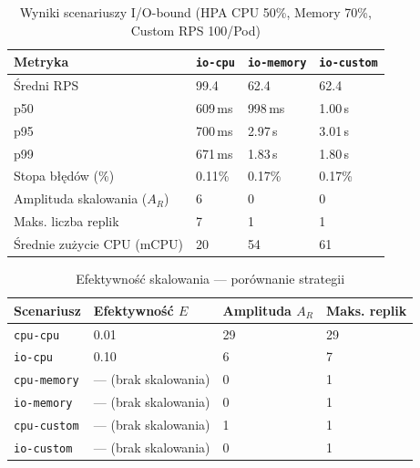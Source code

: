 \begin{table}[H]
  \centering
  \begin{tabularx}{\textwidth}{|l|X|X|X|}
    \hline
    \textbf{Metryka} & \texttt{io-cpu} & \texttt{io-memory} & \texttt{io-custom} \\
    \hline
    Średni RPS & 99.4 & 62.4 & 62.4 \\
    p50 & 609\,ms & 998\,ms & 1.00\,s \\
    p95 & 700\,ms & 2.97\,s & 3.01\,s \\
    p99 & 671\,ms & 1.83\,s & 1.80\,s \\
    Stopa błędów (\%) & 0.11\% & 0.17\% & 0.17\% \\
    Amplituda skalowania ($A_R$) & 6 & 0 & 0 \\
    Maks. liczba replik & 7 & 1 & 1 \\
    Średnie zużycie CPU (mCPU) & 20 & 54 & 61 \\
    \hline
  \end{tabularx}
  \caption{Wyniki scenariuszy I/O-bound (HPA CPU 50\%, Memory 70\%, Custom RPS 100/Pod)}
  \label{tab:io-results}
\end{table}

\begin{table}[H]
  \centering
  \begin{tabularx}{\textwidth}{|l|X|X|X|}
    \hline
    \textbf{Scenariusz} & \textbf{Efektywność $E$} & \textbf{Amplituda $A_R$} & \textbf{Maks. replik} \\
    \hline
    \texttt{cpu-cpu} & 0.01 & 29 & 29 \\
    \texttt{io-cpu} & 0.10 & 6 & 7 \\
    \texttt{cpu-memory} & — (brak skalowania) & 0 & 1 \\
    \texttt{io-memory} & — (brak skalowania) & 0 & 1 \\
    \texttt{cpu-custom} & — (brak skalowania) & 1 & 1 \\
    \texttt{io-custom} & — (brak skalowania) & 0 & 1 \\
    \hline
  \end{tabularx}
  \caption{Efektywność skalowania — porównanie strategii}
  \label{tab:efficiency}
\end{table}
